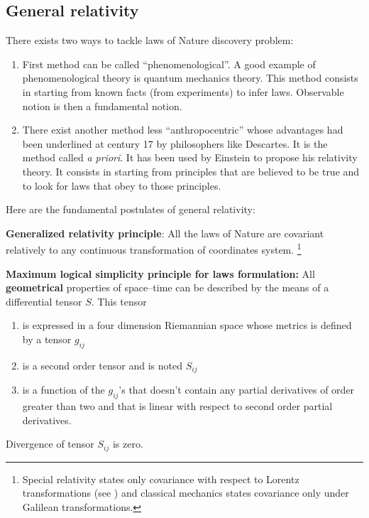 \documentclass[12pt]{book}
\begin{document}
\subsection{General relativity}
There exists two ways to tackle laws of Nature discovery problem: 
\begin{enumerate}
\item First method can be called {
``phenomenological''}. A good example of phenomenological theory is quantum
mechanics theory. This method consists in starting from known facts (from
experiments) to infer laws. Observable notion is then a fundamental notion.
\item There exist another method less ``anthropocentric'' whose advantages had
  been underlined at century 17 by philosophers like Descartes. 
It is the method called {\it a priori}. It has been used by Einstein to propose
his relativity theory. It consists in starting from principles that are
believed to be true and to look for laws that obey to those principles.
\end{enumerate}
Here are the fundamental postulates of general relativity:
\begin{postulat}
{\bf Generalized relativity principle}:
All the laws of Nature are covariant relatively to any
continuous transformation of coordinates system.
\footnote{Special relativity states only covariance with respect to Lorentz
  transformations (see \cite{ph:relat:Misner73g}) and classical
  mechanics states covariance only under Galilean transformations.}
\end{postulat}
\begin{postulat}
{\bf Maximum logical simplicity principle for laws formulation:}
All {\bf geometrical} properties of space--time can be described by the means
of a differential tensor $S$. This tensor 
\begin{enumerate}
\item is expressed in a four dimension Riemannian space whose metrics is
  defined by a tensor $g_{ij}$
\item is a second order tensor and is noted $S_{ij}$
\item is a function of the $g_{ij}$'s that doesn't contain any partial
  derivatives of order greater than two and that is linear with respect to
  second order partial derivatives.
\end{enumerate}
\end{postulat}
\begin{postulat}
Divergence of tensor $S_{ij}$ is zero.
\end{postulat}
\end{document}
